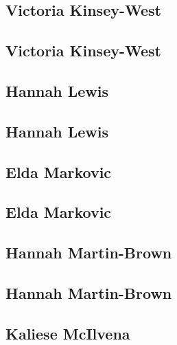 \documentclass[twoside,14pt,a4paper,notitlepage]{memoir}
\begin{document}
\subsection*{Victoria Kinsey-West}
\label{aut:west}

\lipsum[1-2]
\subsection*{Victoria Kinsey-West}
\lipsum[3]



\subsection*{Hannah Lewis}
\label{aut:lewis}

\lipsum[1-2]
\subsection*{Hannah Lewis}
\lipsum[3]



\subsection*{Elda Markovic}
\label{aut:markovic}

\lipsum[1-2]
\subsection*{Elda Markovic}
\lipsum[3]



\subsection*{Hannah Martin-Brown}
\label{aut:brown}

\lipsum[1-2]
\subsection*{Hannah Martin-Brown}
\lipsum[3]



\subsection*{Kaliese McIlvena}
\label{aut:mcilvena}
\end{document}
